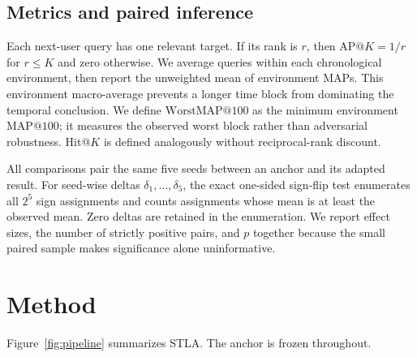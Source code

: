 \documentclass[sigconf,anonymous,review]{acmart}
\makeatletter
\newcommand{\method}{\textsc{STLA}\xspace}
\newcommand{\mapk}{\mathrm{MAP}@100}
\newcommand{\wmap}{\mathrm{WorstMAP}@100}
\makeatother
\begin{document}
\subsection{Metrics and paired inference}
Each next-user query has one relevant target. If its rank is $r$, then $\mathrm{AP}@K=1/r$ for $r\le K$ and zero otherwise. We average queries within each chronological environment, then report the unweighted mean of environment MAPs. This environment macro-average prevents a longer time block from dominating the temporal conclusion. We define $\wmap$ as the minimum environment $\mapk$; it measures the observed worst block rather than adversarial robustness. Hit@$K$ is defined analogously without reciprocal-rank discount.

All comparisons pair the same five seeds between an anchor and its adapted result. For seed-wise deltas $\delta_1,\ldots,\delta_5$, the exact one-sided sign-flip test enumerates all $2^5$ sign assignments and counts assignments whose mean is at least the observed mean. Zero deltas are retained in the enumeration. We report effect sizes, the number of strictly positive pairs, and $p$ together because the small paired sample makes significance alone uninformative.

\section{Method}
Figure~\ref{fig:pipeline} summarizes \method. The anchor is frozen throughout.
\end{document}
